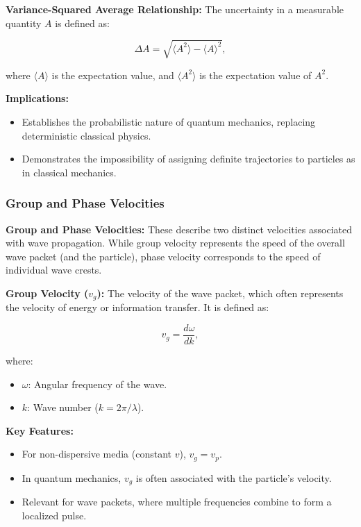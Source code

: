 \documentclass{article}
\newcommand{\eqbox}[1]{\begin{tcolorbox}[colback=gray!10] #1 \end{tcolorbox}}
\newcommand{\conceptbox}[1]{\begin{tcolorbox}[colback=blue!10] #1 \end{tcolorbox}}
\begin{document}
\conceptbox{
\textbf{Variance-Squared Average Relationship:}
The uncertainty in a measurable quantity \( A \) is defined as:
\eqbox{
\[
\Delta A = \sqrt{\langle A^2 \rangle - \langle A \rangle^2},
\]
}
where \( \langle A \rangle \) is the expectation value, and \( \langle A^2 \rangle \) is the expectation value of \( A^2 \).
}

\conceptbox{
\textbf{Implications:}
\begin{itemize}
    \item Establishes the probabilistic nature of quantum mechanics, replacing deterministic classical physics.
    \item Demonstrates the impossibility of assigning definite trajectories to particles as in classical mechanics.
\end{itemize}
}

\subsubsection{Group and Phase Velocities}

\conceptbox{
\textbf{Group and Phase Velocities:}
These describe two distinct velocities associated with wave propagation. While group velocity represents the speed of the overall wave packet (and the particle), phase velocity corresponds to the speed of individual wave crests.
}

\conceptbox{
\textbf{Group Velocity (\( v_g \)):}
The velocity of the wave packet, which often represents the velocity of energy or information transfer. It is defined as:
\eqbox{
\[
v_g = \frac{d\omega}{dk},
\]
}
where:
\begin{itemize}
    \item \( \omega \): Angular frequency of the wave.
    \item \( k \): Wave number (\( k = 2\pi/\lambda \)).
\end{itemize}
\textbf{Key Features:}
\begin{itemize}
    \item For non-dispersive media (constant \( v \)), \( v_g = v_p \).
    \item In quantum mechanics, \( v_g \) is often associated with the particle's velocity.
    \item Relevant for wave packets, where multiple frequencies combine to form a localized pulse.
\end{itemize}
}
\end{document}
